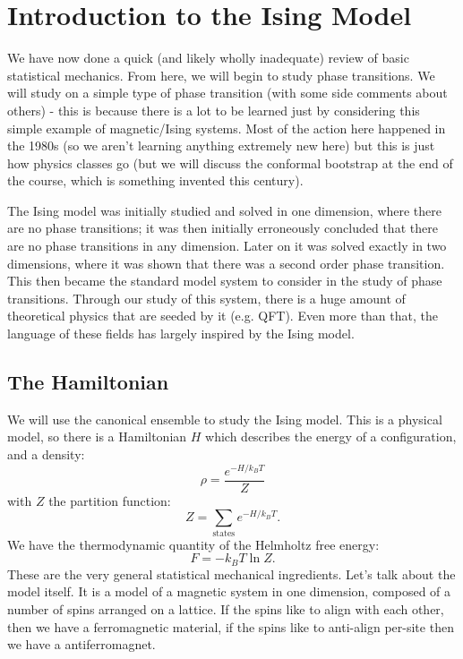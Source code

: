 \section{Introduction to the Ising Model}
We have now done a quick (and likely wholly inadequate) review of basic statistical mechanics. From here, we will begin to study phase transitions. We will study on a simple type of phase transition (with some side comments about others) - this is because there is a lot to be learned just by considering this simple example of magnetic/Ising systems. Most of the action here happened in the 1980s (so we aren't learning anything extremely new here) but this is just how physics classes go (but we will discuss the conformal bootstrap at the end of the course, which is something invented this century).

The Ising model was initially studied and solved in one dimension, where there are no phase transitions; it was then initially erroneously concluded that there are no phase transitions in any dimension. Later on it was solved exactly in two dimensions, where it was shown that there was a second order phase transition. This then became the standard model system to consider in the study of phase transitions. Through our study of this system, there is a huge amount of theoretical physics that are seeded by it (e.g. QFT). Even more than that, the language of these fields has largely inspired by the Ising model.

\subsection{The Hamiltonian}
We will use the canonical ensemble to study the Ising model. This is a physical model, so there is a Hamiltonian $H$ which describes the energy of a configuration, and a density:
\begin{equation}
    \rho = \frac{e^{-H/k_B T}}{Z}
\end{equation} 
with $Z$ the partition function:
\begin{equation}
    Z = \sum_{\text{states}}e^{-H/k_B T}.
\end{equation}
We have the thermodynamic quantity of the Helmholtz free energy:
\begin{equation}
    F = -k_B T \ln Z.
\end{equation}
These are the very general statistical mechanical ingredients. Let's talk about the model itself. It is a model of a magnetic system in one dimension, composed of a number of spins arranged on a lattice. If the spins like to align with each other, then we have a ferromagnetic material, if the spins like to anti-align per-site then we have a antiferromagnet.

